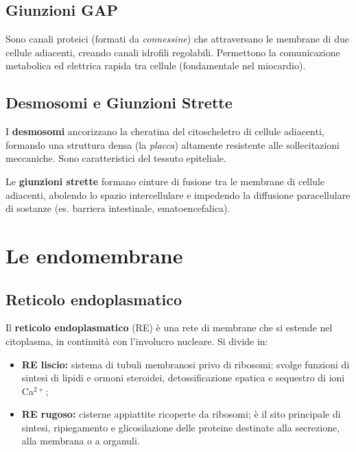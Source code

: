 \documentclass[11pt,a4paper,openright,twoside]{book}
\theoremstyle{definition}
\theoremstyle{plain}
\theoremstyle{remark}
\begin{document}
\subsection{Giunzioni GAP}

Sono canali proteici (formati da \textit{connessine}) che attraversano le membrane di due cellule adiacenti, creando canali idrofili regolabili. Permettono la comunicazione metabolica ed elettrica rapida tra cellule (fondamentale nel miocardio).

\subsection{Desmosomi e Giunzioni Strette}

I \textbf{desmosomi} ancorizzano la cheratina del citoscheletro di cellule adiacenti, formando una struttura densa (la \textit{placca}) altamente resistente alle sollecitazioni meccaniche. Sono caratteristici del tessuto epiteliale.

Le \textbf{giunzioni strette} formano cinture di fusione tra le membrane di cellule adiacenti, abolendo lo spazio intercellulare e impedendo la diffusione paracellulare di sostanze (es. barriera intestinale, ematoencefalica).

\section{Le endomembrane}

\subsection{Reticolo endoplasmatico}

Il \textbf{reticolo endoplasmatico} (RE) è una rete di membrane che si estende nel citoplasma, in continuità con l'involucro nucleare. Si divide in:
\begin{itemize}
  \item \textbf{RE liscio:} sistema di tubuli membranosi privo di ribosomi; svolge funzioni di sintesi di lipidi e ormoni steroidei, detossificazione epatica e sequestro di ioni Ca$^{2+}$;
  \item \textbf{RE rugoso:} cisterne appiattite ricoperte da ribosomi; è il sito principale di sintesi, ripiegamento e glicosilazione delle proteine destinate alla secrezione, alla membrana o a organuli.
\end{itemize}
\end{document}

